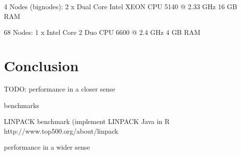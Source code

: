 4 Nodes (bignodes):
2 x Dual Core Intel XEON CPU 5140 @ 2.33 GHz
16 GB RAM

68 Nodes:
1 x Intel Core 2 Duo CPU 6600 @ 2.4 GHz
4 GB RAM


\section{Conclusion}

TODO: performance in a closer sense

      benchmarks

      LINPACK benchmark (implement LINPACK Java in R
      http://www.top500.org/about/linpack

      performance in a wider sense
